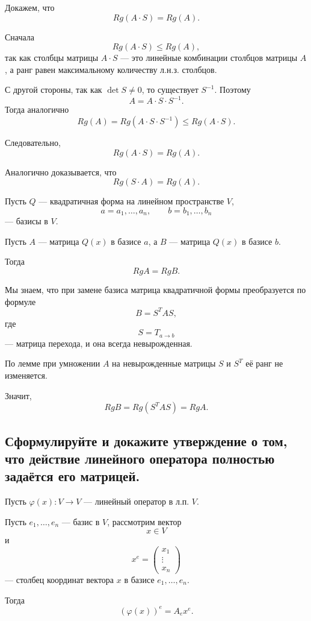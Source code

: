 \begin{Proof}
    Докажем, что
    \[
        Rg(A\cdot S) = Rg(A).
    \]
    
    Сначала
    \[
        Rg(A\cdot S) \leq Rg(A),
    \]
    так как столбцы матрицы $A\cdot S$ --- это линейные комбинации столбцов матрицы $A$, а ранг равен максимальному количеству л.н.з. столбцов.
    
    С другой стороны, так как $\det S \neq 0$, то существует $S^{-1}$. Поэтому
    \[
        A = A\cdot S \cdot S^{-1}.
    \]
    Тогда аналогично
    \[
        Rg(A) = Rg(A\cdot S\cdot S^{-1}) \leq Rg(A\cdot S).
    \]
    
    Следовательно,
    \[
        Rg(A\cdot S)=Rg(A).
    \]
    
    Аналогично доказывается, что
    \[
        Rg(S\cdot A)=Rg(A).
    \]
\end{Proof}

\begin{theorem}
    Пусть $Q$ --- квадратичная форма на линейном пространстве $V$,
    \[
        a = a_1,\ldots,a_n,
        \qquad
        b = b_1,\ldots,b_n
    \]
    --- базисы в $V$.
    
    Пусть $A$ --- матрица $Q(x)$ в базисе $a$, а $B$ --- матрица $Q(x)$ в базисе $b$.
    
    Тогда
    \[
        RgA = RgB.
    \]
\end{theorem}

\begin{Proof}
    Мы знаем, что при замене базиса матрица квадратичной формы преобразуется по формуле
    \[
        B = S^TAS,
    \]
    где
    \[
        S = T_{a \to b}
    \]
    --- матрица перехода, и она всегда невырожденная.
    
    По лемме при умножении $A$ на невырожденные матрицы $S$ и $S^T$ её ранг не изменяется.
    
    Значит,
    \[
        RgB = Rg(S^TAS) = RgA.
    \]
\end{Proof}


\subsection{Сформулируйте и докажите утверждение о том, что действие линейного оператора полностью задаётся его матрицей.}

\begin{theorem}
    Пусть $\varphi(x): V \to V$ --- линейный оператор в л.п. $V$.
    
    Пусть $e_1,\ldots,e_n$ --- базис в $V$, рассмотрим вектор
    \[
        x \in V
    \]
    и
    \[
        x^e =
        \begin{pmatrix}
            x_1 \\
            \vdots \\
            x_n
        \end{pmatrix}
    \]
    --- столбец координат вектора $x$ в базисе $e_1,\ldots,e_n$.
    
    Тогда
    \[
        (\varphi(x))^e = A_e x^e.
    \]
\end{theorem}

